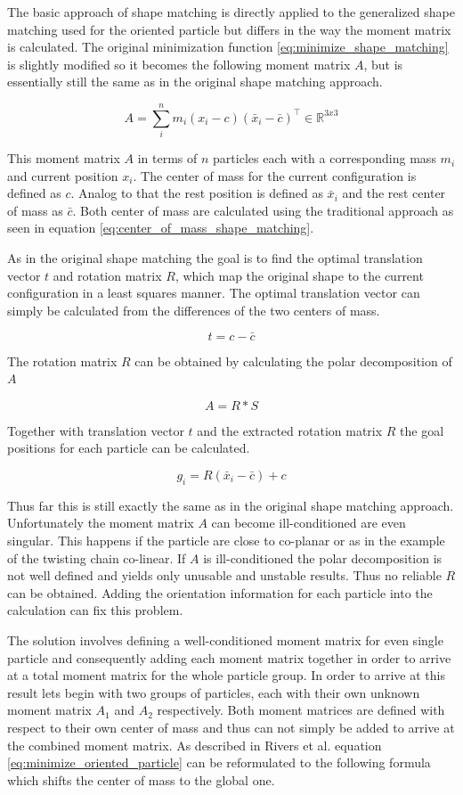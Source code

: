 The basic approach of shape matching is directly applied to the generalized shape matching used for the oriented particle but differs in the way the moment matrix is calculated. The original minimization function \ref{eq:minimize_shape_matching} is slightly modified so it becomes the following moment matrix $A$, but is essentially still the same as in the original shape matching approach.

\begin{equation}
A = \sum\limits_i^n m_i(x_i-c)(\bar{x}_i - \bar{c})^\top  \in \mathbb{R}^{3x3}
\label{eq:minimize_oriented_particle}
\end{equation}

This moment matrix $A$ in terms of $n$ particles each with a corresponding mass $m_i$ and current position $x_i$. The center of mass for the current configuration is defined as $c$. Analog to that the rest position is defined as $\bar{x}_i$ and the rest center of mass as $\bar{c}$. Both center of mass are calculated using the traditional approach as seen in equation \ref{eq:center_of_mass_shape_matching}.

As in the original shape matching the goal is to find the optimal translation vector $t$ and rotation matrix $R$, which map the original shape to the current configuration in a least squares manner. The optimal translation vector can simply be calculated from the differences of the two centers of mass.

\[
t = c - \bar{c}
\]

The rotation matrix $R$ can be obtained by calculating the polar decomposition of $A$

\[
A = R*S
\]

Together with translation vector $t$ and the extracted rotation matrix $R$ the goal positions for each particle can be calculated.

\[
g_i = R(\bar{x}_i-\bar{c})+c
\]

Thus far this is still exactly the same as in the original shape matching approach. Unfortunately  the moment matrix $A$ can become ill-conditioned are even singular. This happens if the particle are close to co-planar or as in the example of the twisting chain co-linear. If $A$ is ill-conditioned the polar decomposition is not well defined and yields only unusable and unstable results. Thus no reliable $R$ can be obtained. Adding the orientation information for each particle into the calculation can fix this problem.

The solution involves defining a well-conditioned moment matrix for even single particle and consequently adding each moment matrix together in order to arrive at a total moment matrix for the whole particle group. In order to arrive at this result lets begin with two groups of particles, each with their own unknown moment matrix $A_1$ and $A_2$ respectively. Both moment matrices are defined with respect to their own center of mass and thus can not simply be added to arrive at the combined moment matrix. As described in Rivers et al. \cite{Rivers:2007te} equation \ref{eq:minimize_oriented_particle} can be reformulated to the following formula which shifts the center of mass to the global one.

